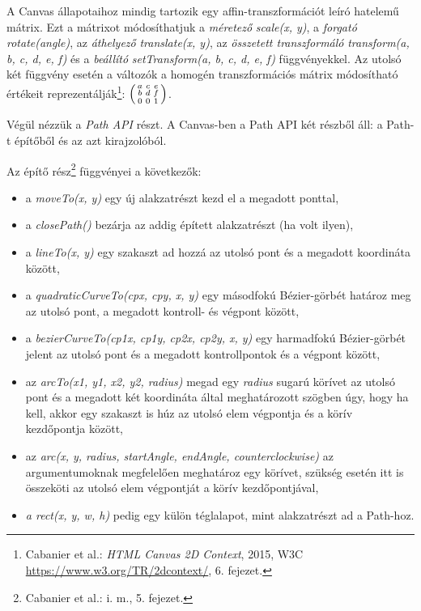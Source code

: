 \documentclass[12pt]{report}
\theoremstyle{definition}
\newcommand{\func}[1]{{\textsl{#1}}}
\begin{document}
A Canvas állapotaihoz mindig tartozik egy affin-transzformációt leíró hatelemű
mátrix. Ezt a mátrixot módosíthatjuk a \emph{méretező} \func{scale(x, y)}, a
\emph{forgató} \func{rotate(angle)}, az \emph{áthelyező} \func{translate(x,
y)}, az \emph{összetett transzformáló} \func{transform(a, b, c, d, e, f)} és a
\emph{beállító} \func{setTransform(a, b, c, d, e, f)} függvényekkel. Az utolsó
két függvény esetén a változók a homogén transzformációs mátrix módosítható
értékeit reprezentálják\footnote{Cabanier et al.: \emph{{HTML} Canvas {2D}
Context}, 2015, W3C\\ {\footnotesize\url{https://www.w3.org/TR/2dcontext/}}, 6.
fejezet.}: ${\Bigl(\begin{smallmatrix}a & c & e \\ b & d & f \\ 0 & 0 & 1 \\
\end{smallmatrix}\Bigr)}$.

Végül nézzük a \emph{Path API} részt. A Canvas-ben a Path API két részből áll:
a Path-t építőből és az azt kirajzolóból.

Az építő rész\footnote{Cabanier et al.: i. m., 5. fejezet.} függvényei a
következők:
\begin{itemize}
  \item a \func{moveTo(x, y)} egy új alakzatrészt kezd el a megadott ponttal,
  \item a \func{closePath()} bezárja az addig épített alakzatrészt (ha volt
  ilyen),
  \item a \func{lineTo(x, y)} egy szakaszt ad hozzá az utolsó pont és a
  megadott koordináta között,
  \item a \func{quadraticCurveTo(cpx, cpy, x, y)} egy másodfokú Bézier-görbét
  határoz meg az utolsó pont, a megadott kontroll- és végpont között,
  \item a \func{bezierCurveTo(cp1x, cp1y, cp2x, cp2y, x, y)} egy harmadfokú
  Bézier-görbét jelent az utolsó pont és a megadott kontrollpontok és a végpont
  között,
  \item az \func{arcTo(x1, y1, x2, y2, radius)} megad egy \func{radius} sugarú
  körívet az utolsó pont és a megadott két koordináta által meghatározott
  szögben úgy, hogy ha kell, akkor egy szakaszt is húz az utolsó elem végpontja
  és a körív kezdőpontja között,
  \item az \func{arc(x, y, radius, startAngle, endAngle, counterclockwise)} az
  argumentumoknak megfelelően meghatároz egy körívet, szükség esetén itt is
  összeköti az utolsó elem végpontját a körív kezdőpontjával,
  \item \func{a rect(x, y, w, h)} pedig egy külön téglalapot, mint alakzatrészt
  ad a Path-hoz.
\end{itemize}
\end{document}
